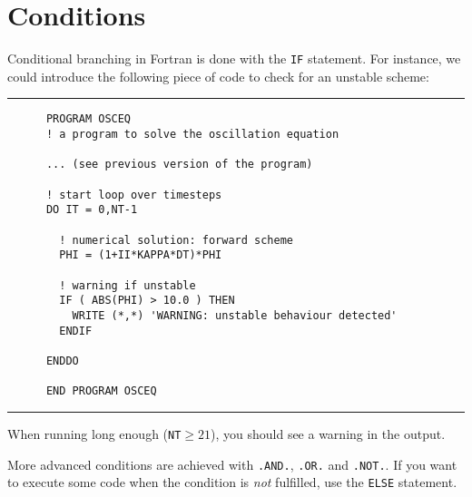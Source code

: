 \documentclass[a4paper]{article}
\begin{document}
\section{Conditions}
%
\par
Conditional branching in Fortran is done with the \verb+IF+ statement. For instance, we could introduce the following piece of code to check for an unstable scheme:
%
{\vspace{10pt}\hrule\small\vspace*{-2pt}\begin{verbatim}
	  PROGRAM OSCEQ
	  ! a program to solve the oscillation equation
	  
	  ... (see previous version of the program)
	  
	  ! start loop over timesteps
	  DO IT = 0,NT-1
	  
	    ! numerical solution: forward scheme
	    PHI = (1+II*KAPPA*DT)*PHI
	    
	    ! warning if unstable
	    IF ( ABS(PHI) > 10.0 ) THEN
	      WRITE (*,*) 'WARNING: unstable behaviour detected'
	    ENDIF
	  
	  ENDDO
	  
	  END PROGRAM OSCEQ
\end{verbatim}\hrule\vspace{5pt}}
%
\par
When running long enough (\verb+NT+$\geq21$), you should see a warning in the output.
%
\par
More advanced conditions are achieved with \verb+.AND.+, \verb+.OR.+ and \verb+.NOT.+. If you want to execute some code when the condition is \emph{not} fulfilled, use the \verb+ELSE+ statement.
%
\end{document}
